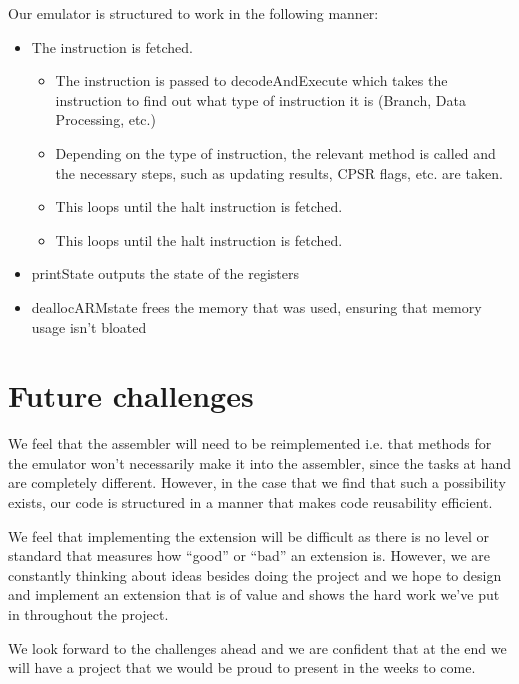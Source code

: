 \documentclass[11pt]{article}
\begin{document}
Our emulator is structured to work in the following manner:

\begin{itemize}

    \item The instruction is fetched.
    
    \begin{itemize}
    
        \item The instruction is passed to decodeAndExecute which  takes the instruction to find out what type of instruction it is (Branch, Data Processing, etc.)
        \item Depending on the type of instruction, the relevant method is called and the necessary steps, such as updating results, CPSR flags, etc. are taken.
        \item This loops until the halt instruction is fetched.
        \item This loops until the halt instruction is fetched.
    \end{itemize}
  
    \item printState outputs the state of the registers
    \item deallocARMstate frees the memory that was used, ensuring that memory usage isn't bloated

\end{itemize}

\section{Future challenges}

We feel that the assembler will need to be reimplemented i.e. that methods for the emulator won’t necessarily make it into the assembler, since the tasks at hand are completely different. However, in the case that we find that such a possibility exists, our code is structured in a manner that makes code reusability efficient.

We feel that implementing the extension will be difficult as there is no level or standard that measures how “good” or “bad” an extension is. However, we are constantly thinking about ideas besides doing the project and we hope to design and implement an extension that is of value and shows the hard work we’ve put in throughout the project.

We look forward to the challenges ahead and we are confident that at the end we will have a project that we would be proud to present in the weeks to come.
\end{document}
